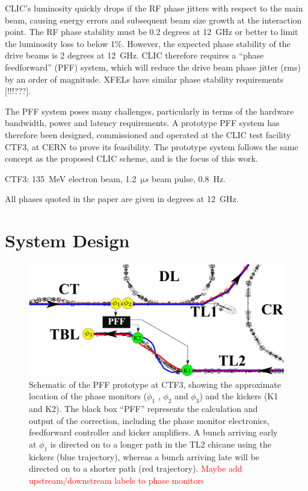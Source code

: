 \documentclass[%
 reprint,
 amsmath,amssymb,
 aps,
]{revtex4-1}
\begin{document}
CLIC's luminosity quickly drops if the RF phase jitters with respect to the 
main beam, causing energy errors and subsequent beam size growth at the 
interaction point. The RF phase 
stability must be 0.2 degrees at 12~GHz or better to limit the luminosity loss 
to below 1\%.  However, the expected phase stability of the drive beams is 2 
degrees at 12~GHz. CLIC therefore requires a ``phase feedforward'' (PFF) 
system, which will reduce the drive beam phase jitter (rms) by an order of 
magnitude. XFELs have similar phase stability requirements [!!!???].

The PFF system poses many challenges, particularly in terms of the hardware 
bandwidth, power and latency requirements. A prototype PFF system has therefore 
been designed, commissioned and operated at the CLIC 
test facility CTF3, at CERN to prove its feasibility. The prototype system 
follows the same concept as the proposed CLIC scheme, and is the focus of this 
work. 

CTF3: 135~MeV electron beam, 1.2~\(\mathrm{\mu}s\) beam pulse, 0.8~Hz.

All phases quoted in the paper are given in degrees at 12~GHz.

\section{\label{s:ctfLayout}System Design}

\begin{figure}
	\includegraphics[width=\textwidth]{figs/ctfpffLayout}%
	\caption{\label{fig:pffLayout}Schematic of the PFF prototype at CTF3, 
	showing the approximate location of the phase monitors (\(\phi_1\) , 
	\(\phi_2\) and \(\phi_3\)) and
		the kickers (K1 and K2). The black box “PFF” represents the calculation 
		and output of the correction, including the phase monitor
		electronics, feedforward controller and kicker amplifiers. A bunch 
		arriving early at \(\phi_1\) is directed on to a longer path in the TL2 
		chicane
		using the kickers (blue trajectory), whereas a bunch arriving late will 
		be directed on to a shorter path (red trajectory). 
		\textcolor{red}{Maybe add upstream/downstream labels to phase monitors}}
\end{figure}
\end{document}
